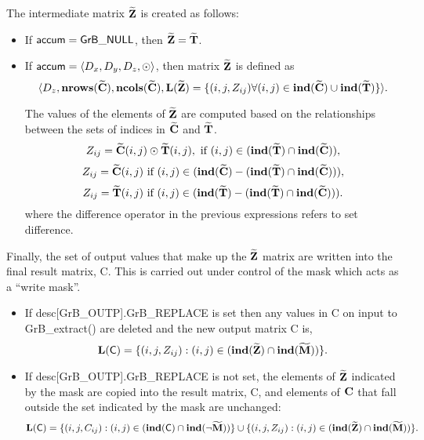 The intermediate matrix ${\bf \widetilde{Z}}$ is created as follows:
\begin{itemize}
    \item If ${\sf accum} = {\sf GrB\_NULL}$, then ${\bf \widetilde{Z}} = {\bf \widetilde{T}}$.

    \item If ${\sf accum} = \langle D_x, D_y, D_z, \odot \rangle$, then matrix ${\bf \widetilde{Z}}$ is defined as 
        \[ \langle D_z, \bold{nrows}({\bf \widetilde{C}}), \bold{ncols}({\bf \widetilde{C}}),
        \bold{L}({\bf \widetilde{Z}}) 
		= \{(i,j,Z_{ij})  \forall (i,j) \in \bold{ind}({\bf \widetilde{C}}) \cup 
        \bold{ind}({\bf \widetilde{T}}) \} \rangle. \]

        The values of the elements of ${\bf \widetilde{Z}}$ are computed based on the 
        relationships between the sets of indices in ${\bf \widetilde{C}}$ and 
        ${\bf \widetilde{T}}$.
\[
Z_{ij} = {\bf \widetilde{C}}(i,j) \odot {\bf \widetilde{T}}(i,j), \ \mbox{if}\  (i,j) \in  (\bold{ind}({\bf \widetilde{T}}) \cap \bold{ind}({\bf \widetilde{C}})),
\]
\[
Z_{ij} = \matrix{\widetilde{C}}(i,j) \ \mbox{if}\  (i,j) \in  (\bold{ind}(\matrix{\widetilde{C}}) - (\bold{ind}(\matrix{\widetilde{T}}) \cap \bold{ind}(\matrix{\widetilde{C}}))),
\]
\[
Z_{ij} = \matrix{\widetilde{T}}(i,j) \ \mbox{if}\  (i,j) \in  (\bold{ind}(\matrix{\widetilde{T}}) - (\bold{ind}(\matrix{\widetilde{T}}) \cap \bold{ind}(\matrix{\widetilde{C}}))).
\]
where the difference operator in the previous expressions refers to set difference.
\end{itemize}

Finally, the set of output values that make up the ${\bf \widetilde{Z}}$ 
matrix are written into the final result matrix, {\sf C}. 
This is carried out under control of the mask which acts as a ``write mask''.
\begin{itemize}
\item If {\sf desc[GrB\_OUTP].GrB\_REPLACE} is set then any values in {\sf C} 
on input to {\sf GrB\_extract()} are deleted and the new output matrix {\sf C} is,
\[ \bold{L}({\sf C}) = \{(i,j,Z_{ij}) : (i,j) \in (\bold{ind}({\bf \widetilde{Z}}) 
\cap \bold{ind}({\bf \widetilde{M}})) \}. \]

\item If {\sf desc[GrB\_OUTP].GrB\_REPLACE} is not set, the elements of 
${\bf \widetilde{Z}}$ indicated by 
the mask are copied into the result matrix, {\sf C}, and elements of 
${\bf C}$ that fall outside the set indicated by the mask are unchanged:
\[ \bold{L}({\sf C}) = \{(i,j,C_{ij}) : (i, j) \in (\bold{ind}({\sf C}) 
\cap \bold{ind}(\neg {\bf \widetilde{M}})) \} \cup \{(i,j,Z_{ij}) : (i,j) \in 
(\bold{ind}({\bf \widetilde{Z}}) \cap \bold{ind}({\bf \widetilde{M}})) \}. \]
\end{itemize}

